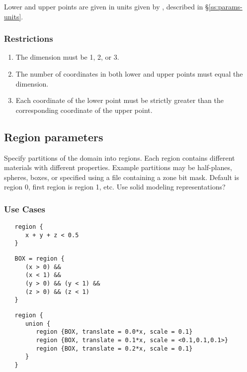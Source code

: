 Lower and upper points are given in units given by ,
described in \S\ref{ss:params-units}.

\subsubsection{Restrictions}

\begin{enumerate}
\item The dimension must be 1, 2, or 3.
\item The number of coordinates in both lower and upper points must equal the dimension.
\item Each coordinate of the lower point must be strictly greater than the corresponding coordinate of the upper point.
\end{enumerate}

\subsection{Region parameters} \label{s:region}


Specify partitions of the domain into regions.  Each region contains
different materials with different properties.  Example partitions may
be half-planes, spheres, boxes, or specified using a file containing a
zone bit mask.  Default is region 0, first region is region 1, etc.
Use solid modeling representations?

\subsubsection{Use Cases}

\begin{verbatim}
   region {
      x + y + z < 0.5
   }
\end{verbatim}

\begin{verbatim}
   BOX = region {
      (x > 0) &&
      (x < 1) &&
      (y > 0) && (y < 1) &&
      (z > 0) && (z < 1)
   }
\end{verbatim}

\begin{verbatim}
   region {
      union {
         region {BOX, translate = 0.0*x, scale = 0.1}
         region {BOX, translate = 0.1*x, scale = <0.1,0.1,0.1>}
         region {BOX, translate = 0.2*x, scale = 0.1}
      }
   }
\end{verbatim}

